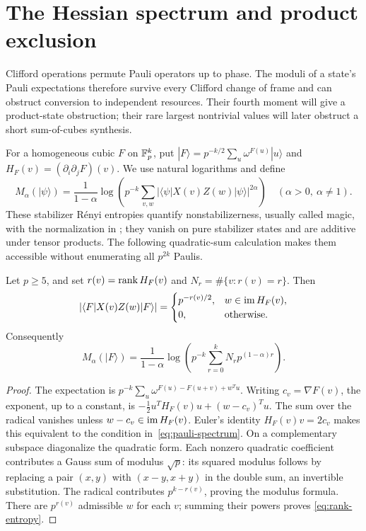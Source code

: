 \section{The Hessian spectrum and product exclusion}\label{sec:spectrum}
Clifford operations permute Pauli operators up to phase. The moduli of a state's
Pauli expectations therefore survive every Clifford change of frame and can
obstruct conversion to independent resources. Their fourth moment will give a
product-state obstruction; their rare largest nontrivial values will later
obstruct a short sum-of-cubes synthesis.

For a homogeneous cubic $F$ on $\mathbb F_p^k$, put
$|F\rangle=p^{-k/2}\sum_u\omega^{F(u)}|u\rangle$ and
$H_F(v)=(\partial_i\partial_jF)(v)$. We use natural logarithms and define
\[
 M_\alpha(|\psi\rangle)=\frac{1}{1-\alpha}
 \log\left(p^{-k}\sum_{v,w}|\langle\psi|X(v)Z(w)|\psi\rangle|^{2\alpha}\right)
 \quad(\alpha>0,\ \alpha\ne1).
\]
These stabilizer R\'enyi entropies quantify nonstabilizerness, usually called
magic, with the normalization in
\cite{leone,wangli}; they vanish on pure stabilizer states and are additive
under tensor products. The following quadratic-sum calculation makes them
accessible without enumerating all $p^{2k}$ Paulis.

\begin{theorem}\label{thm:hessian}
Let $p\geq5$, and set $r(v)=\operatorname{rank} H_F(v)$ and
$N_r=\#\{v:r(v)=r\}$. Then
\begin{equation}\label{eq:pauli-spectrum}
 |\langle F|X(v)Z(w)|F\rangle|=
 \begin{cases}p^{-r(v)/2},&w\in\operatorname{im} H_F(v),\\0,&\text{otherwise.}\end{cases}
\end{equation}
Consequently
\begin{equation}\label{eq:rank-entropy}
 M_\alpha(|F\rangle)=\frac{1}{1-\alpha}
 \log\left(p^{-k}\sum_{r=0}^kN_rp^{(1-\alpha)r}\right).
\end{equation}
\end{theorem}
\begin{proof}
The expectation is $p^{-k}\sum_u\omega^{F(u)-F(u+v)+w^Tu}$.
Writing $c_v=\nabla F(v)$, the exponent, up to a constant, is
$-\tfrac12u^TH_F(v)u+(w-c_v)^Tu$.
The sum over the radical vanishes unless $w-c_v\in\operatorname{im} H_F(v)$.
Euler's identity $H_F(v)v=2c_v$ makes this equivalent to the condition
in~\eqref{eq:pauli-spectrum}. On a complementary subspace diagonalize the
quadratic form. Each nonzero quadratic coefficient contributes a Gauss sum
of modulus $\sqrt p$: its squared modulus follows by replacing a pair
$(x,y)$ with $(x-y,x+y)$ in the double sum, an invertible substitution.
The radical contributes $p^{k-r(v)}$, proving the modulus formula.
There are $p^{r(v)}$ admissible $w$ for each $v$; summing their powers proves
\eqref{eq:rank-entropy}.
\end{proof}

